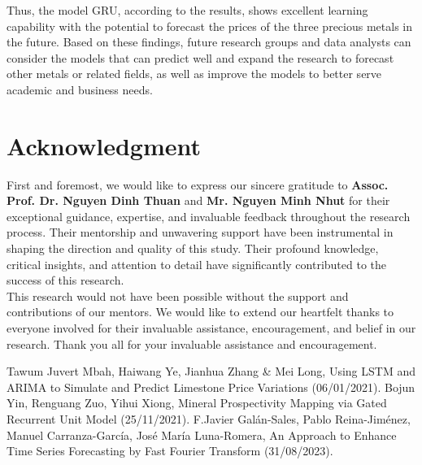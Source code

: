 \documentclass{ieeeojies}
\begin{document}
\indent Thus, the  model GRU, according to the results, shows excellent learning capability with the potential to forecast the prices of the three precious metals in the future. Based on these findings, future research groups and data analysts can consider the models that can predict well and expand the research to forecast other metals or related fields, as well as improve the models to better serve academic and business needs.

\section*{Acknowledgment}
First and foremost, we would like to express our sincere gratitude to \textbf{Assoc. Prof. Dr. Nguyen Dinh Thuan} and \textbf{Mr. Nguyen Minh Nhut} for their exceptional guidance, expertise, and invaluable feedback throughout the research process. Their mentorship and unwavering support have been instrumental in shaping the direction and quality of this study. Their profound knowledge, critical insights, and attention to detail have significantly contributed to the success of this research.
\\This research would not have been possible without the support and contributions of our mentors. We would like to extend our heartfelt thanks to everyone involved for their invaluable assistance, encouragement, and belief in our research. Thank you all for your invaluable assistance and encouragement.

\begin{thebibliography}{00}
 Tawum Juvert Mbah, Haiwang Ye, Jianhua Zhang & Mei Long,
Using LSTM and ARIMA to Simulate and Predict Limestone Price Variations (06/01/2021).
 Bojun Yin, Renguang Zuo, Yihui Xiong, Mineral Prospectivity Mapping via Gated Recurrent Unit Model (25/11/2021).
 F.Javier Galán-Sales, Pablo Reina-Jiménez, Manuel Carranza-García, José María Luna-Romera, An Approach to Enhance Time Series Forecasting by Fast Fourier Transform (31/08/2023).

\end{thebibliography}


\EOD
\end{document}
